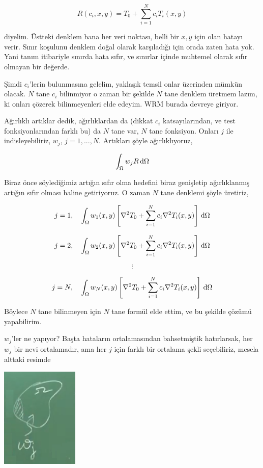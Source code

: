 \documentclass[12pt,fleqn]{article}\usepackage{../../common}
\begin{document}
$$
R(c_i,x,y) = T_0 + \sum _{i=1}^{N} c_i T_i(x,y)
$$

diyelim. Üstteki denklem bana her veri noktası, belli bir $x,y$ için olan hatayı
verir. Sınır koşulunu denklem doğal olarak karşıladığı için orada zaten hata
yok. Yani tanım itibariyle sınırda hata sıfır, ve sınırlar içinde muhtemel
olarak sıfır olmayan bir değerde.

Şimdi $c_i$'lerin bulunmasına gelelim, yaklaşık temsil onlar üzerinden mümkün
olacak. $N$ tane $c_i$ bilinmiyor o zaman bir şekilde $N$ tane denklem üretmem
lazım, ki onları çözerek bilinmeyenleri elde edeyim. WRM burada devreye giriyor.

Ağırlıklı artıklar dedik, ağırlıklardan da (dikkat $c_i$ katsayılarından, ve
test fonksiyonlarından farklı bu) da $N$ tane var, $N$ tane fonksiyon. Onları
$j$ ile indisleyebiliriz, $w_j$, $j=1,...,N$. Artıkları şöyle ağırlıklıyoruz,

$$
\int_\Omega w_j R \,\mathrm{d} \Omega
$$

Biraz önce söylediğimiz artığın sıfır olma hedefini biraz genişletip
ağırlıklanmış artığın sıfır olması haline getiriyoruz. O zaman $N$ tane denklemi
şöyle üretiriz,

$$
j=1,\quad
\int_\Omega w_1 (x,y) \left[
  \nabla^2 T_0 + \sum _{i=1}^{N} c_i \nabla^2 T_i(x,y) 
  \right] \,\mathrm{d} \Omega
$$

$$
j=2,\quad
\int_\Omega w_2 (x,y) \left[
  \nabla^2 T_0 + \sum _{i=1}^{N} c_i \nabla^2 T_i(x,y) 
  \right] \,\mathrm{d} \Omega
$$

$$
\vdots
$$

$$
j=N,\quad
\int_\Omega w_N (x,y) \left[
  \nabla^2 T_0 + \sum _{i=1}^{N} c_i \nabla^2 T_i(x,y) 
  \right] \,\mathrm{d} \Omega
$$

Böylece $N$ tane bilinmeyen için $N$ tane formül elde ettim, ve bu şekilde
çözümü yapabilirim.

$w_j$'ler ne yapıyor? Başta hataların ortalamasından bahsetmiştik hatırlarsak,
her $w_j$ bir nevi ortalamadır, ama her $j$ için farklı bir ortalama şekli
seçebiliriz, mesela alttaki resimde

\includegraphics[width=10em]{compscieng_app45aerofem1_02.png}
\end{document}
